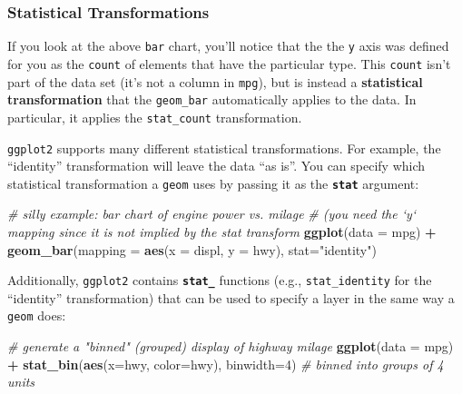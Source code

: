 \documentclass[]{book}
\newenvironment{Shaded}{\begin{snugshade}}{\end{snugshade}}
\newcommand{\KeywordTok}[1]{\textcolor[rgb]{0.13,0.29,0.53}{\textbf{#1}}}
\newcommand{\DataTypeTok}[1]{\textcolor[rgb]{0.13,0.29,0.53}{#1}}
\newcommand{\DecValTok}[1]{\textcolor[rgb]{0.00,0.00,0.81}{#1}}
\newcommand{\StringTok}[1]{\textcolor[rgb]{0.31,0.60,0.02}{#1}}
\newcommand{\CommentTok}[1]{\textcolor[rgb]{0.56,0.35,0.01}{\textit{#1}}}
\newcommand{\OperatorTok}[1]{\textcolor[rgb]{0.81,0.36,0.00}{\textbf{#1}}}
\newcommand{\NormalTok}[1]{#1}
\theoremstyle{definition}
\theoremstyle{definition}
\theoremstyle{remark}
\begin{document}
\subsubsection{Statistical
Transformations}\label{statistical-transformations}

If you look at the above \texttt{bar} chart, you'll notice that the the
\texttt{y} axis was defined for you as the \texttt{count} of elements
that have the particular type. This \texttt{count} isn't part of the
data set (it's not a column in \texttt{mpg}), but is instead a
\textbf{statistical transformation} that the \texttt{geom\_bar}
automatically applies to the data. In particular, it applies the
\texttt{stat\_count} transformation.

\texttt{ggplot2} supports many different statistical transformations.
For example, the ``identity'' transformation will leave the data ``as
is''. You can specify which statistical transformation a \texttt{geom}
uses by passing it as the \textbf{\texttt{stat}} argument:

\begin{Shaded}
\begin{Highlighting}[]
\CommentTok{# silly example: bar chart of engine power vs. milage}
\CommentTok{# (you need the `y` mapping since it is not implied by the stat transform}
\KeywordTok{ggplot}\NormalTok{(}\DataTypeTok{data =}\NormalTok{ mpg) }\OperatorTok{+}
\StringTok{  }\KeywordTok{geom_bar}\NormalTok{(}\DataTypeTok{mapping =} \KeywordTok{aes}\NormalTok{(}\DataTypeTok{x =}\NormalTok{ displ, }\DataTypeTok{y =}\NormalTok{ hwy), }\DataTypeTok{stat=}\StringTok{"identity"}\NormalTok{)}
\end{Highlighting}
\end{Shaded}

Additionally, \texttt{ggplot2} contains \textbf{\texttt{stat\_}}
functions (e.g., \texttt{stat\_identity} for the ``identity''
transformation) that can be used to specify a layer in the same way a
\texttt{geom} does:

\begin{Shaded}
\begin{Highlighting}[]
\CommentTok{# generate a "binned" (grouped) display of highway milage}
\KeywordTok{ggplot}\NormalTok{(}\DataTypeTok{data =}\NormalTok{ mpg) }\OperatorTok{+}
\StringTok{  }\KeywordTok{stat_bin}\NormalTok{(}\KeywordTok{aes}\NormalTok{(}\DataTypeTok{x=}\NormalTok{hwy, }\DataTypeTok{color=}\NormalTok{hwy), }\DataTypeTok{binwidth=}\DecValTok{4}\NormalTok{)  }\CommentTok{# binned into groups of 4 units}
\end{Highlighting}
\end{Shaded}
\end{document}
